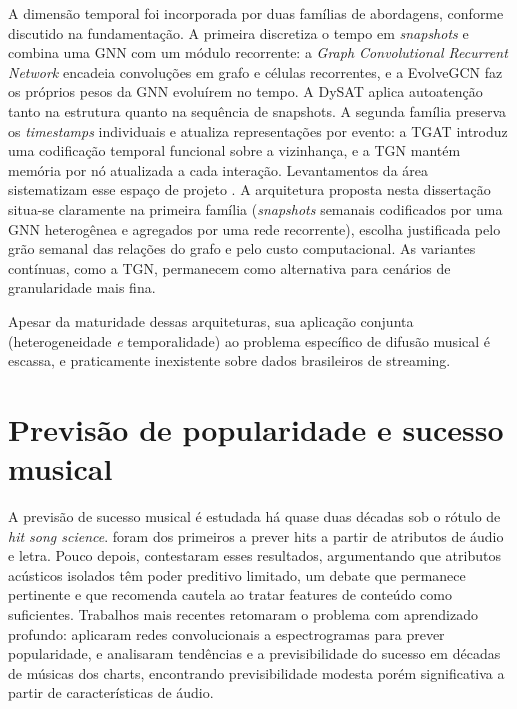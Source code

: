 A dimensão temporal foi incorporada por duas famílias de abordagens, conforme discutido na fundamentação. A primeira discretiza o tempo em \emph{snapshots} e combina uma GNN com um módulo recorrente: a \emph{Graph Convolutional Recurrent Network} \citep{seo2018gcrn} encadeia convoluções em grafo e células recorrentes, e a EvolveGCN \citep{pareja2020evolvegcn} faz os próprios pesos da GNN evoluírem no tempo. A DySAT \citep{sankar2020dysat} aplica autoatenção tanto na estrutura quanto na sequência de snapshots. A segunda família preserva os \emph{timestamps} individuais e atualiza representações por evento: a TGAT \citep{xu2020tgat} introduz uma codificação temporal funcional sobre a vizinhança, e a TGN \citep{rossi2020tgn} mantém memória por nó atualizada a cada interação. Levantamentos da área sistematizam esse espaço de projeto \citep{kazemi2020dynamicsurvey}. A arquitetura proposta nesta dissertação situa-se claramente na primeira família (\emph{snapshots} semanais codificados por uma GNN heterogênea e agregados por uma rede recorrente), escolha justificada pelo grão semanal das relações do grafo e pelo custo computacional. As variantes contínuas, como a TGN, permanecem como alternativa para cenários de granularidade mais fina.

Apesar da maturidade dessas arquiteturas, sua aplicação conjunta (heterogeneidade \emph{e} temporalidade) ao problema específico de difusão musical é escassa, e praticamente inexistente sobre dados brasileiros de streaming.


\section{Previsão de popularidade e sucesso musical}

A previsão de sucesso musical é estudada há quase duas décadas sob o rótulo de \emph{hit song science}. \citet{dhanaraj2005hit} foram dos primeiros a prever hits a partir de atributos de áudio e letra. Pouco depois, \citet{pachet2008hitscience} contestaram esses resultados, argumentando que atributos acústicos isolados têm poder preditivo limitado, um debate que permanece pertinente e que recomenda cautela ao tratar features de conteúdo como suficientes. Trabalhos mais recentes retomaram o problema com aprendizado profundo: \citet{yang2017revisiting} aplicaram redes convolucionais a espectrogramas para prever popularidade, e \citet{interiano2018musical} analisaram tendências e a previsibilidade do sucesso em décadas de músicas dos charts, encontrando previsibilidade modesta porém significativa a partir de características de áudio.


